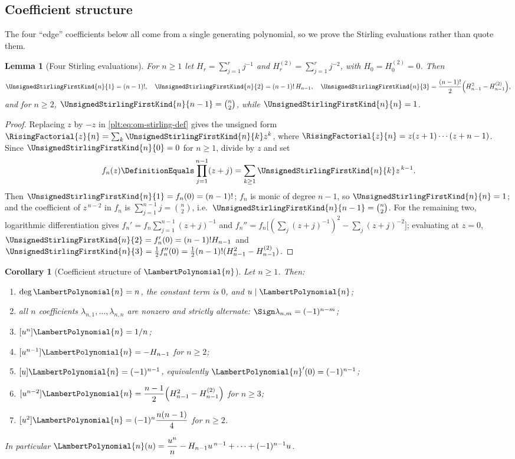 \documentclass[11pt,oneside]{article}
\theoremstyle{plain}
\newtheorem{lemma}[theorem]{Lemma}
\newtheorem{corollary}[theorem]{Corollary}
\theoremstyle{definition}
\theoremstyle{remark}
\newcommand{\stirlingone}[2]{\UnsignedStirlingFirstKind{#1}{#2}}
\newcommand{\LamP}[1]{\LambertPolynomial{#1}}
\begin{document}
\subsection{Coefficient structure}

The four ``edge'' coefficients below all come from a single generating
polynomial, so we prove the Stirling evaluations rather than quote them.

\begin{lemma}[Four Stirling evaluations]
\label{plt:lem:om-stirling-values}
For \(n\ge1\) let \(H_r=\sum_{j=1}^{r}j^{-1}\) and
\(H_r^{(2)}=\sum_{j=1}^{r}j^{-2}\), with \(H_0=H_0^{(2)}=0\).  Then
\[
 \stirlingone{n}{1}=(n-1)!,\quad
 \stirlingone{n}{2}=(n-1)!\,H_{n-1},\quad
 \stirlingone{n}{3}=\frac{(n-1)!}{2}\Bigl(H_{n-1}^{2}-H_{n-1}^{(2)}\Bigr),
\]
and for \(n\ge2\), \(\stirlingone{n}{n-1}=\binom{n}{2}\), while
\(\stirlingone{n}{n}=1\).
\end{lemma}

\begin{proof}
Replacing \(z\) by \(-z\) in \eqref{plt:eq:om-stirling-def} gives the
unsigned form \(\RisingFactorial{z}{n}=\sum_{k}\stirlingone{n}{k}z^{k}\),
where \(\RisingFactorial{z}{n}=z(z+1)\cdots(z+n-1)\).  Since
\(\stirlingone{n}{0}=0\) for \(n\ge1\), divide by \(z\) and set
\[
 f_n(z)\DefinitionEquals\prod_{j=1}^{n-1}(z+j)=\sum_{k\ge1}\stirlingone{n}{k}z^{\,k-1}.
\]
Then \(\stirlingone{n}{1}=f_n(0)=(n-1)!\); \(f_n\) is monic of degree
\(n-1\), so \(\stirlingone{n}{n}=1\); and the coefficient of \(z^{\,n-2}\) in
\(f_n\) is \(\sum_{j=1}^{n-1}j=\binom{n}{2}\), i.e.\
\(\stirlingone{n}{n-1}=\binom{n}{2}\).  For the remaining two, logarithmic
differentiation gives
\(f_n'=f_n\sum_{j=1}^{n-1}(z+j)^{-1}\) and
\(f_n''=f_n\bigl[(\sum_j(z+j)^{-1})^{2}-\sum_j(z+j)^{-2}\bigr]\); evaluating
at \(z=0\),
\(\stirlingone{n}{2}=f_n'(0)=(n-1)!H_{n-1}\) and
\(\stirlingone{n}{3}=\tfrac12f_n''(0)=\tfrac12(n-1)!(H_{n-1}^{2}-H_{n-1}^{(2)})\).
\end{proof}

\begin{corollary}[Coefficient structure of \(\LamP{n}\)]
\label{plt:cor:lambert-coefficients}
Let \(n\ge1\).  Then:
\begin{enumerate}[label=\textup{(\roman*)}]
\item \(\deg\LamP{n}=n\), the constant term is \(0\), and \(u\mid\LamP{n}\);
\item all \(n\) coefficients \(\lambda_{n,1},\ldots,\lambda_{n,n}\) are
      nonzero and strictly alternate: \(\Sign\lambda_{n,m}=(-1)^{n-m}\);
\item \([u^{n}]\LamP{n}=1/n\);
\item \([u^{n-1}]\LamP{n}=-H_{n-1}\) for \(n\ge2\);
\item \([u]\LamP{n}=(-1)^{n-1}\), equivalently
      \({\LamP{n}}'(0)=(-1)^{n-1}\);
\item \([u^{n-2}]\LamP{n}=\dfrac{n-1}{2}\Bigl(H_{n-1}^{2}-H_{n-1}^{(2)}\Bigr)\)
      for \(n\ge3\);
\item \([u^{2}]\LamP{n}=(-1)^{n}\dfrac{n(n-1)}{4}\) for \(n\ge2\).
\end{enumerate}
In particular
\(\LamP{n}(u)=\dfrac{u^{n}}{n}-H_{n-1}u^{\,n-1}+\cdots+(-1)^{n-1}u\).
\end{corollary}
\end{document}
